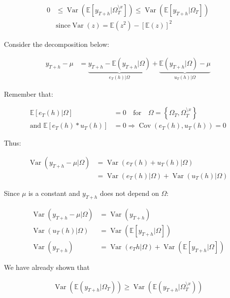 \documentclass[12pt,a4paper]{article}
\newcommand{\Var}{\operatorname{Var}} %
\newcommand{\Cov}{\operatorname{Cov}}
\begin{document}
\begin{align*}
0 & \leq \Var \left( \mathbb{E} \left[ y_{T + h} | \Omega_{T}^{\setminus x} \right] \right) \leq \Var \left( \mathbb{E} \left[ y_{T + h} | \Omega_{T} \right] \right) \\
  & \text{since} \Var(z) = \mathbb{E} (z^2) - \left[ \mathbb{E} (z) \right]^2
\end{align*}

Consider the decomposition below:

\begin{align*}
  y_{T + h} - \mu & = \underbrace{ y_{T + h} - \mathbb{E} \left( y_{T + h} | \Omega \right)}_{e_T (h)| \Omega} + \underbrace{\mathbb{E} \left( y_{T + h} | \Omega \right) - \mu}_{u_T (h) | \Omega} 
\end{align*}

Remember that:

\begin{align*}
  \mathbb{E} [e_T (h)| \Omega] & = 0 \quad \text{for} \quad \Omega = \left\{ \Omega_T, \Omega_T^{\setminus x} \right\} \\
  \text{and } \mathbb{E} [e_T (h) * u_T (h)] & = 0 \Rightarrow \Cov(e_T (h), u_T (h)) = 0
\end{align*}

Thus:

\begin{align*}
  \Var \left( y_{T + h} - \mu | \Omega \right) & = \Var \left( e_T (h) + u_T (h) | \Omega \right) \\
  & = \Var \left( e_T (h)  | \Omega \right) +  \Var \left( u_T (h) | \Omega \right)
\end{align*}

Since \(\mu\) is a constant and \(y_{T + h}\) does not depend on
\(\Omega\):

\begin{align*}
  \Var\left(y_{T + h} - \mu | \Omega \right) & = \Var\left( y_{T + h}\right) \\
  \Var\left(u_{T} (h) | \Omega \right) & = \Var\left( \mathbb{E} [ y_{T + h} | \Omega ]\right) \\
  \Var\left(  y_{T + h} \right) & = \Var\left(  e_{T} h  | \Omega \right) + \Var\left( \mathbb{E} [ y_{T + h} | \Omega ]\right)
\end{align*}

We have already shown that

\begin{align*}
\Var \left( \mathbb{E}(y_{T + h} | \Omega_T) \right) \geq \Var \left( \mathbb{E} \left(y_{T +h} | \Omega_{T}^{\setminus x} \right) \right)
\end{align*}
\end{document}
